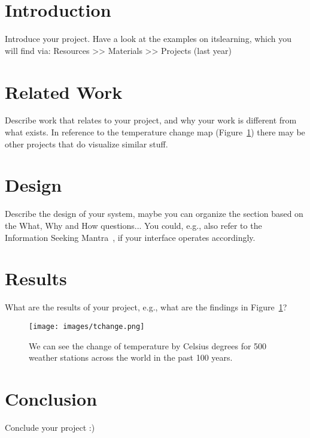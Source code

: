 \documentclass{egpubl}
\begin{document}
\section{Introduction}

Introduce your project. Have a look at the examples on itslearning, which you will find via: Resources >> Materials >> Projects (last year)

\section{Related Work}

Describe work that relates to your project, and why your work is different from what exists. In reference to the temperature change map (Figure~\ref{fig:tchange}) there may be other projects that do visualize similar stuff.

\section{Design}

Describe the design of your system, maybe you can organize the section based on the What, Why and How questions... You could, e.g., also refer to the Information Seeking Mantra~\cite{InformationSeeking}, if your interface operates accordingly.

\section{Results}

What are the results of your project, e.g., what are the findings in Figure~\ref{fig:tchange}?

\begin{figure}[tbp]
  \texttt{[image: images/tchange.png]}
  \caption{\label{fig:tchange}%
We can see the change of temperature by Celsius degrees for 500 weather stations across the world in the past 100 years. 
  }
\end{figure}

\section{Conclusion}

Conclude your project :)



\end{document}

